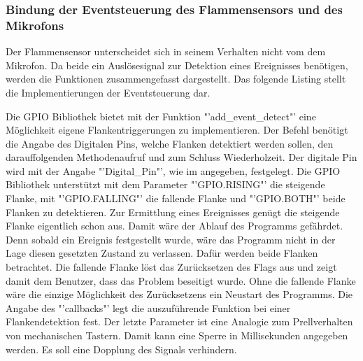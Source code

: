 \subsubsection*{Bindung der Eventsteuerung des Flammensensors und des Mikrofons}
	Der Flammensensor unterscheidet sich in seinem Verhalten nicht vom dem Mikrofon. Da beide ein Auslösesignal zur Detektion eines Ereignisses benötigen, werden die Funktionen zusammengefasst dargestellt. Das folgende Listing stellt die Implementierungen der Eventsteuerung dar.
	
	Die GPIO Bibliothek bietet mit der Funktion "'add\_event\_detect"' eine Möglichkeit eigene Flankentriggerungen zu implementieren. Der Befehl benötigt die Angabe des Digitalen Pins, welche Flanken detektiert werden sollen, den darauffolgenden Methodenaufruf und zum Schluss Wiederholzeit. Der digitale Pin wird mit der Angabe "'Digital\_Pin"', wie im  angegeben, festgelegt. Die GPIO Bibliothek unterstützt mit dem Parameter "'GPIO.RISING"' die steigende Flanke, mit "'GPIO.FALLING"' die fallende Flanke und "'GPIO.BOTH"' beide Flanken zu detektieren. Zur Ermittlung eines Ereignisses genügt die steigende Flanke eigentlich schon aus. Damit wäre der Ablauf des Programms gefährdet. Denn sobald ein Ereignis festgestellt wurde, wäre das Programm nicht in der Lage diesen gesetzten Zustand zu verlassen. Dafür werden beide Flanken betrachtet. Die fallende Flanke löst das Zurücksetzen des Flags aus und zeigt damit dem Benutzer, dass das Problem beseitigt wurde. Ohne die fallende Flanke wäre die einzige Möglichkeit des Zurücksetzens ein Neustart des Programms. Die Angabe des "'callbacks"' legt die auszuführende Funktion bei einer Flankendetektion fest. Der letzte Parameter ist eine Analogie zum Prellverhalten von mechanischen Tastern. Damit kann eine Sperre in Millisekunden angegeben werden. Es soll eine Dopplung des Signals verhindern.

